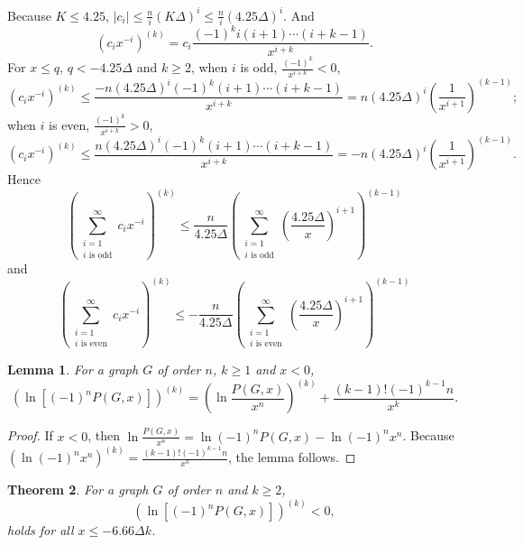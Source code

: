 \documentclass[12pt]{article}
\newtheorem{theorem}{Theorem}[section]
\newtheorem{lemma}[theorem]{Lemma}
\theoremstyle{definition}
\begin{document}
Because $K\leq 4.25$, \(|c_i| \leq \frac{n}{i}(K\Delta)^i\leq \frac{n}{i}(4.25\Delta)^i\). And $$(c_i x^{-i})^{(k)}=c_i \frac{(-1)^k i(i+1)\cdots(i+k-1)}{x^{i+k}}.$$
For $x\leq q$, $q<-4.25\Delta$ and $k\geq 2$, when $i$ is odd, $\frac{(-1)^k}{x^{i+k}}<0$,
$$(c_i x^{-i})^{(k)}\leq \dfrac{-n(4.25\Delta)^i(-1)^{k}(i+1)\cdots(i+k-1)}{x^{i+k}}=n(4.25\Delta)^{i}(\frac{1}{x^{i+1}})^{(k-1)};$$
when $i$ is even, $\frac{(-1)^k}{x^{i+k}}>0$,
$$(c_i x^{-i})^{(k)}\leq \dfrac{n(4.25\Delta)^i(-1)^{k}(i+1)\cdots(i+k-1)}{x^{i+k}}=-n(4.25\Delta)^{i}(\frac{1}{x^{i+1}})^{(k-1)}.$$
Hence
\begin{equation}\label{e3}(\sum\limits_{\substack{ i =1\\ \text{$i$ is odd}}}^\infty c_i x^{-i})^{(k)}\leq \frac{n}{4.25\Delta}(\sum\limits_{\substack{ i =1\\ \text{$i$ is odd}}}^\infty (\frac{4.25\Delta}{x})^{i+1})^{(k-1)}\end{equation}
and \begin{equation}\label{e4}(\sum\limits_{\substack{ i =1\\ \text{$i$ is even}}}^\infty c_i x^{-i})^{(k)}\leq -\frac{n}{4.25\Delta}(\sum\limits_{\substack{ i =1\\ \text{$i$ is even}}}^\infty (\frac{4.25\Delta}{x})^{i+1})^{(k-1)}\end{equation}


\begin{lemma}\label{2} For a graph $G$ of order $n$, $k\geq 1$ and $x<0$,
\[(\ln[(-1)^n P(G, x)])^{(k)}=(\ln\frac{P(G,x)}{x^n})^{(k)}+\frac{(k-1)!(-1)^{k-1}n}{x^{k}}. \]
\end{lemma}

\begin{proof} If $x<0$, then $\ln\frac{P(G,x)}{x^n}=\ln(-1)^nP(G,x)-\ln(-1)^nx^n$.
Because $(\ln(-1)^nx^n)^{(k)}=\frac{(k-1)!(-1)^{k-1}n}{x^{k}}$, the lemma follows.
\end{proof}


\begin{theorem} \label{main}For a graph $G$ of order $n$ and $k\geq 2$,
\[(\ln[(-1)^n P(G, x)])^{(k)}<0, \] holds for all $x\leq -6.66\Delta k$.\end{theorem}
\end{document}
